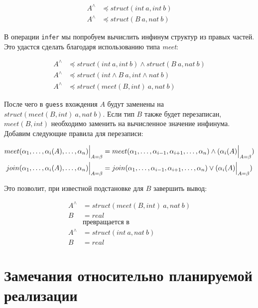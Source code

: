 \documentclass[10pt,russian]{article}
\newcommand{\subtype}{\preccurlyeq}
\newcommand{\meet}{\wedge}
\newcommand{\join}{\vee}
\begin{document}
\begin{align*}
A^{\wedge} &\subtype struct(int ~ a, int ~ b) \\
A^{\wedge} &\subtype struct(B ~ a, nat ~ b)
\end{align*}

В операции \texttt{infer} мы попробуем вычислить инфинум структур из правых
частей. Это удастся сделать благодаря использованию типа \textit{meet}:

\begin{align*}
A^{\wedge} &\subtype struct(int ~ a, int ~ b) \meet struct(B ~ a, nat ~ b) \\
A^{\wedge} &\subtype struct(int \meet B ~ a, int \meet nat ~ b) \\
A^{\wedge} &\subtype struct(meet(B, int) ~ a, nat ~ b)
\end{align*}

После чего в \texttt{guess} вхождения $A$ будут заменены на $struct(meet(B,
int) ~ a, nat ~ b)$. Если тип $B$ также будет перезаписан, $meet(B, int)$
необходимо заменить на вычисленное значение инфинума. Добавим следующие правила
для перезаписи:

\begin{align*}
meet(\alpha_1, \dotsc, \alpha_i(A), \dotsc, \alpha_n) \Bigl\lvert_{A = \beta} &=
    meet(\alpha_1, \dotsc, \alpha_{i - 1}, \alpha_{i + 1}, \dotsc, \alpha_n) \meet (
    \alpha_i(A) \Bigl\lvert_{A = \beta}) \\
join(\alpha_1, \dotsc, \alpha_i(A), \dotsc, \alpha_n) \Bigl\lvert_{A = \beta} &=
    join(\alpha_1, \dotsc, \alpha_{i - 1}, \alpha_{i + 1}, \dotsc, \alpha_n) \join (
    \alpha_i(A) \Bigl\lvert_{A = \beta})
\end{align*}

Это позволит, при известной подстановке для $B$ завершить вывод:

\begin{align*}
A^{\wedge} &= struct(meet(B, int) ~ a, nat ~ b) \\
B &= real \\[1ex]
&\text{превращается в} \\[1ex]
A^{\wedge} &= struct(int ~ a, nat ~ b) \\
B &= real
\end{align*}

\section{Замечания относительно планируемой реализации}
\end{document}

